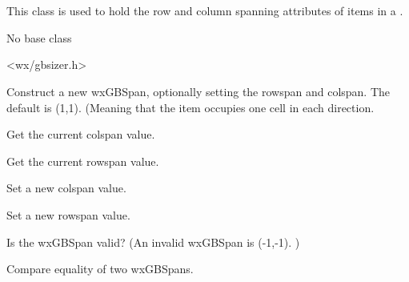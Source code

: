 
\section{}\label{wxgbspan}

This class is used to hold the row and column spanning attributes of
items in a .


No base class


<wx/gbsizer.h>




\label{wxgbspanwxgbspan}



Construct a new wxGBSpan, optionally setting the rowspan and colspan.
The default is (1,1).  (Meaning that the item occupies one cell in
each direction.

\label{wxgbspangetcolspan}


Get the current colspan value.

\label{wxgbspangetrowspan}


Get the current rowspan value.

\label{wxgbspansetcolspan}


Set a new colspan value.

\label{wxgbspansetrowspan}


Set a new rowspan value.

\label{wxgbspanoperatorunknown}


Is the wxGBSpan valid?  (An invalid wxGBSpan is (-1,-1). )

\label{wxgbspanoperatorequal}


Compare equality of two wxGBSpans.

